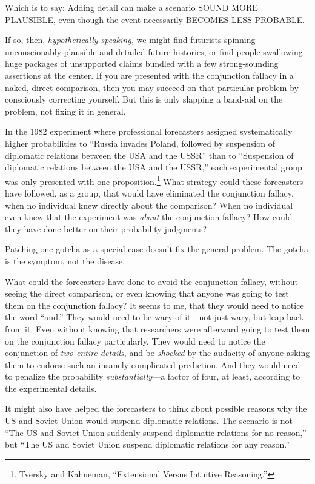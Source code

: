 {
 Which is to say: Adding detail can make a scenario SOUND MORE
PLAUSIBLE, even though the event necessarily BECOMES LESS PROBABLE.}

{
 If so, then, \textit{hypothetically speaking,} we might find
futurists spinning unconscionably plausible and detailed future
histories, or find people swallowing huge packages of unsupported
claims bundled with a few strong-sounding assertions at the center. If
you are presented with the conjunction fallacy in a naked, direct
comparison, then you may succeed on that particular problem by
consciously correcting yourself. But this is only slapping a band-aid
on the problem, not fixing it in general.}

{
 In the 1982 experiment where professional forecasters assigned
systematically higher probabilities to ``Russia
invades Poland, followed by suspension of diplomatic relations between
the USA and the USSR'' than to
``Suspension of diplomatic relations between the USA
and the USSR,'' each experimental group was only
presented with one proposition.\footnote{Tversky and Kahneman, ``Extensional Versus
Intuitive Reasoning.''} What strategy could
these forecasters have followed, as a group, that would have eliminated
the conjunction fallacy, when no individual knew directly about the
comparison? When no individual even knew that the experiment was
\textit{about} the conjunction fallacy? How could they have done better
on their probability judgments?}

{
 Patching one gotcha as a special case doesn't fix
the general problem. The gotcha is the symptom, not the disease.}

{
 What could the forecasters have done to avoid the conjunction
fallacy, without seeing the direct comparison, or even knowing that
anyone was going to test them on the conjunction fallacy? It seems to
me, that they would need to notice the word
``and.'' They would need to be wary
of it---not just wary, but leap back from it. Even without knowing that
researchers were afterward going to test them on the conjunction
fallacy particularly. They would need to notice the conjunction of
\textit{two entire details}, and be \textit{shocked} by the audacity of
anyone asking them to endorse such an insanely complicated prediction.
And they would need to penalize the probability
\textit{substantially}{}---a factor of four, at least, according to the
experimental details.}

{
 It might also have helped the forecasters to think about possible
reasons why the US and Soviet Union would suspend diplomatic relations.
The scenario is not ``The US and Soviet Union suddenly
suspend diplomatic relations for no reason,'' but
``The US and Soviet Union suspend diplomatic relations
for any reason.''}

